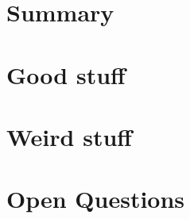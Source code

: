 \documentclass[11pt]{article}
\title{$TITLE}
\author{TLA+ Study Group}
\date{\today}
\begin{document}
\maketitle

\section*{Summary}

\section*{Good stuff}

\section*{Weird stuff}

\section*{Open Questions}
\end{document}
